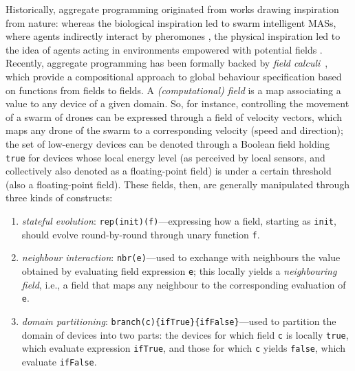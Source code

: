 \documentclass[11pt]{article}
\begin{document}
Historically, aggregate programming originated from works drawing inspiration from nature: whereas the biological inspiration led to swarm intelligent MASs, where agents indirectly interact by pheromones \cite{DBLP:conf/atal/ParunakBS02}, the physical inspiration led to the idea of agents acting in environments empowered with potential fields \cite{DBLP:journals/trob/HwangA92}.
%
Recently, aggregate programming has been formally backed by \emph{field calculi}~\cite{viroli2019jlamp-si-coord}, which provide a compositional approach
 to global behaviour specification
 based on functions from fields to fields.
%
A \emph{(computational) field} is a map associating a value to any device of a given domain.
%
So, for instance, controlling the movement of a swarm of drones can be expressed through a field of velocity vectors, which maps any drone of the swarm to a corresponding velocity (speed and direction); the set of low-energy devices can be denoted through a Boolean field holding \texttt{true} for devices whose local energy level (as perceived by local sensors, and collectively also denoted as a floating-point field) is under a certain threshold (also a floating-point field).
%
These fields, then, are generally manipulated through three kinds of constructs:
\begin{enumerate}
\item \emph{stateful evolution}: \lstinline|rep(init)(f)|---expressing how a field, starting as \lstinline|init|, should evolve round-by-round through unary function \lstinline|f|.
\item \emph{neighbour interaction}: \lstinline|nbr(e)|---used to exchange with neighbours the value obtained by evaluating field expression \lstinline|e|; this locally yields a \emph{neighbouring field}, i.e., a field that maps any neighbour to the corresponding evaluation of \lstinline|e|.
\item \emph{domain partitioning}: \lstinline|branch(c){ifTrue}{ifFalse}|---used to partition the domain of devices into two parts: the devices for which field \lstinline|c| is locally \lstinline|true|, which evaluate expression \lstinline|ifTrue|, and those for which \lstinline|c| yields \lstinline|false|, which evaluate \lstinline|ifFalse|. 
\end{enumerate}
\end{document}
